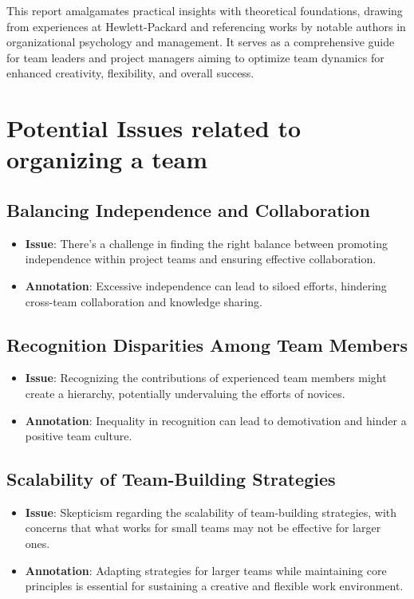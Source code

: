 \documentclass[a4paper, twoside]{article}
\begin{document}
This report amalgamates practical insights with theoretical foundations, drawing from experiences at Hewlett-Packard and referencing works by notable authors in organizational psychology and management. It serves as a comprehensive guide for team leaders and project managers aiming to optimize team dynamics for enhanced creativity, flexibility, and overall success.

\section{Potential Issues related to organizing a team}
\subsection{Balancing Independence and Collaboration}
\begin{itemize}
  \item \textbf{Issue}: There's a challenge in finding the right balance between promoting independence within project teams and ensuring effective collaboration.
  \item \textbf{Annotation}: Excessive independence can lead to siloed efforts, hindering cross-team collaboration and knowledge sharing.\cite{Tuckman1965}
\end{itemize}

\subsection{Recognition Disparities Among Team Members}
\begin{itemize}
  \item \textbf{Issue}: Recognizing the contributions of experienced team members might create a hierarchy, potentially undervaluing the efforts of novices.
  \item \textbf{Annotation}: Inequality in recognition can lead to demotivation and hinder a positive team culture.\cite{Deci2001}
\end{itemize}

\subsection{Scalability of Team-Building Strategies}
\begin{itemize}
  \item \textbf{Issue}: Skepticism regarding the scalability of team-building strategies, with concerns that what works for small teams may not be effective for larger ones.
  \item \textbf{Annotation}: Adapting strategies for larger teams while maintaining core principles is essential for sustaining a creative and flexible work environment.\cite{Hackman2002}
\end{itemize}
\end{document}
